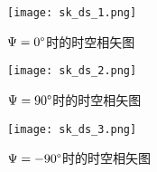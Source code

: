 \documentclass[blue]{elegantnote}
\begin{document}
\begin{enumerate}
	\begin{figure}[!hbtp]
		\centering
		\texttt{[image: sk\_ds\_1.png]}
		\caption{$\Psi=0 \degree$时的时空相矢图}                 
		\label{figur:sk_ds_1}                                   
	\end{figure}
	\begin{figure}[!hbtp]
		\centering
		\texttt{[image: sk\_ds\_2.png]}
		\caption{$\Psi=90 \degree$时的时空相矢图}                 
		\label{figur:sk_ds_2}                                   
	\end{figure}	
	\begin{figure}[!hbtp]
		\centering
		\texttt{[image: sk\_ds\_3.png]}
		\caption{$\Psi=-90 \degree$时的时空相矢图}                 
		\label{figur:sk_ds_3}                                   
	\end{figure}
\end{enumerate}
\end{document}
